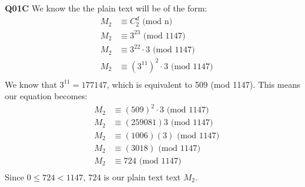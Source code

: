 \documentclass[11pt]{article}
\begin{document}
\textbf{Q01C} We know the the plain text will be of the form:
\begin{align*}
 M_2 & \equiv C_2^d \text{ (mod n)} \\
 M_2  & \equiv 3^{23}  \text{ (mod 1147)} \\
 M_2  & \equiv 3^{22}\cdot3  \text{ (mod 1147)} \\
 M_2  & \equiv (3^{11})^2\cdot3  \text{ (mod 1147)} \\
\end{align*}
We know that $3^{11} = 177147$, which is equivalent to 509 (mod 1147). This means our equation becomes:
\begin{align*}
 M_2  & \equiv (509)^2\cdot3  \text{ (mod 1147)} \\
 M_2  & \equiv (259081)3  \text{ (mod 1147)} \\
 M_2  & \equiv (1006)(3)  \text{ (mod 1147)} \\
 M_2  & \equiv (3018)  \text{ (mod 1147)} \\
 M_2 & \equiv 724  \text{ (mod 1147)} \\
\end{align*}
Since $ 0 \leq 724 < 1147 $, 724  is our plain text text $M_2$.
\end{document}
